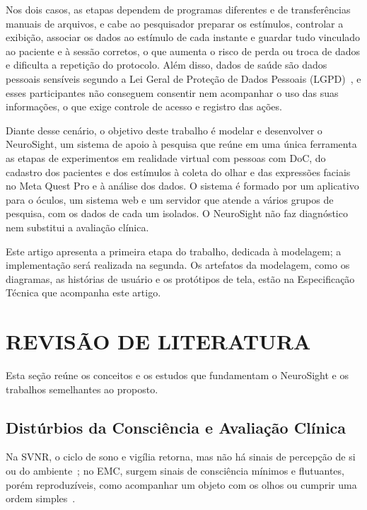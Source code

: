\documentclass[conference,a4paper,10pt]{IEEEtran}
\begin{document}
Nos dois casos, as etapas dependem de programas diferentes e de transferências manuais de arquivos, e cabe ao pesquisador preparar os estímulos, controlar a exibição, associar os dados ao estímulo de cada instante e guardar tudo vinculado ao paciente e à sessão corretos, o que aumenta o risco de perda ou troca de dados e dificulta a repetição do protocolo. Além disso, dados de saúde são dados pessoais sensíveis segundo a Lei Geral de Proteção de Dados Pessoais (LGPD)~\cite{LGPD}, e esses participantes não conseguem consentir nem acompanhar o uso das suas informações, o que exige controle de acesso e registro das ações.

Diante desse cenário, o objetivo deste trabalho é modelar e desenvolver o NeuroSight, um sistema de apoio à pesquisa que reúne em uma única ferramenta as etapas de experimentos em realidade virtual com pessoas com DoC, do cadastro dos pacientes e dos estímulos à coleta do olhar e das expressões faciais no Meta Quest Pro e à análise dos dados. O sistema é formado por um aplicativo para o óculos, um sistema web e um servidor que atende a vários grupos de pesquisa, com os dados de cada um isolados. O NeuroSight não faz diagnóstico nem substitui a avaliação clínica.

Este artigo apresenta a primeira etapa do trabalho, dedicada à modelagem; a implementação será realizada na segunda. Os artefatos da modelagem, como os diagramas, as histórias de usuário e os protótipos de tela, estão na Especificação Técnica que acompanha este artigo.

\section{REVISÃO DE LITERATURA}

Esta seção reúne os conceitos e os estudos que fundamentam o NeuroSight e os trabalhos semelhantes ao proposto.

\subsection{Distúrbios da Consciência e Avaliação Clínica}

Na SVNR, o ciclo de sono e vigília retorna, mas não há sinais de percepção de si ou do ambiente~\cite{LAUREYS}; no EMC, surgem sinais de consciência mínimos e flutuantes, porém reproduzíveis, como acompanhar um objeto com os olhos ou cumprir uma ordem simples~\cite{GIACINO2002}.
\end{document}
